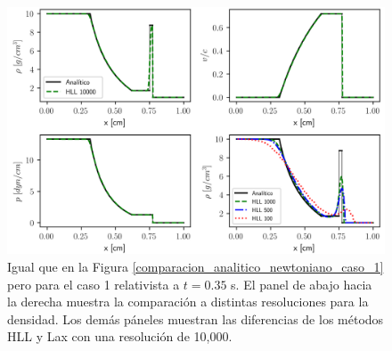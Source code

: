 \documentclass[12pt,a4paper]{book}
\begin{document}
\begin{figure}
  \centering
    \includegraphics[width=1.0\textwidth]{./Figuras/verificacion_del_codigo/caso_relativista/caso_rel_rar_shock.png}
  \caption{Igual que en la Figura \ref{comparacion_analitico_newtoniano_caso_1} pero para el caso 1 
  relativista 
  a $t = 0.35$ s. El panel de abajo 
  hacia la
  derecha muestra la comparación a distintas resoluciones para la densidad. Los demás páneles muestran
  las diferencias de los métodos HLL y Lax con una resolución de 10,000.}\label{caso_rel_rar_shock}
\end{figure}

\end{document}
